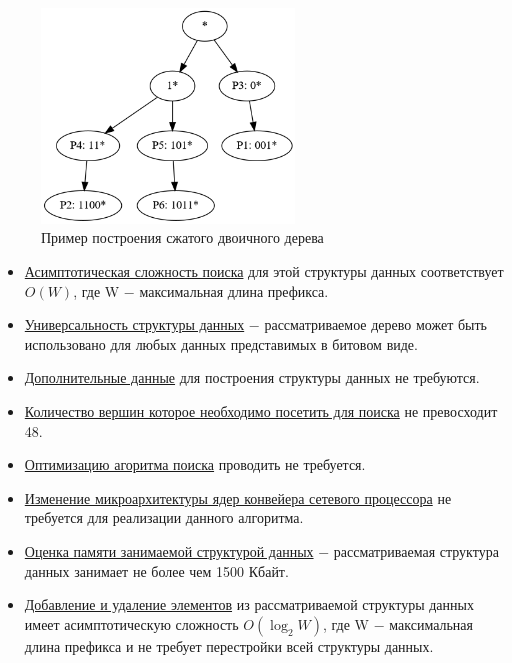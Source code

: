 \documentclass[a4peper, 12pt, titlepage, finall]{report}
\begin{document}
            \begin{figure}[h]
                \centering
                \includegraphics[width=0.6\textwidth]{compressed_binary.png}
                \caption{Пример построения сжатого двоичного дерева}\label{fig:mesh2}
            \end{figure}

            \begin{itemize}
                \item\underline{Асимптотическая сложность поиска} для этой структуры данных соответствует {\ttfamily $O(W)$},
                где {\ttfamily W} $-$ максимальная длина префикса.
                \item\underline{Универсальность структуры данных} $-$ рассматриваемое дерево может быть использовано для любых данных представимых в битовом виде.
                \item\underline{Дополнительные данные} для построения структуры данных не требуются.
                \item\underline{Количество вершин которое необходимо посетить для поиска} не превосходит 48.
                \item\underline{Оптимизацию агоритма поиска} проводить не требуется.
                \item\underline{Изменение микроархитектуры ядер конвейера сетевого процессора} не требуется для реализации данного алгоритма.
                \item\underline{Оценка памяти занимаемой структурой данных} $-$ рассматриваемая структура данных занимает не более чем 1500 Кбайт.
                \item\underline{Добавление и удаление элементов} из рассматриваемой структуры данных имеет асимптотическую сложность 
                {\ttfamily $O(\log_2{W})$}, где {\ttfamily W} $-$ максимальная длина префикса и не требует перестройки всей структуры данных.
            \end{itemize}
\end{document}
